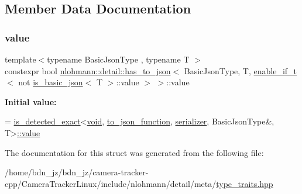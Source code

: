 \subsection{Member Data Documentation}
\mbox{\label{structnlohmann_1_1detail_1_1has__to__json_3_01_basic_json_type_00_01_t_00_01enable__if__t_3_01nob111e71d40e2273c290d1ce5c6a3b84f_ac5e2f95bd9fa54c6ea870e923e395b63}} 
\subsubsection{\texorpdfstring{value}{value}}
{\footnotesize\ttfamily template$<$typename Basic\+Json\+Type , typename T $>$ \\
constexpr bool \hyperlink{structnlohmann_1_1detail_1_1has__to__json}{nlohmann\+::detail\+::has\+\_\+to\+\_\+json}$<$ Basic\+Json\+Type, T, \hyperlink{namespacenlohmann_1_1detail_a02bcbc878bee413f25b985ada771aa9c}{enable\+\_\+if\+\_\+t}$<$ not \hyperlink{structnlohmann_1_1detail_1_1is__basic__json}{is\+\_\+basic\+\_\+json}$<$ T $>$\+::value $>$ $>$\+::value\hspace{0.3cm}{\ttfamily [static]}}

{\bfseries Initial value\+:}
\begin{DoxyCode}
=
        \hyperlink{namespacenlohmann_1_1detail_a7542b4dbac07817fd4849ecfa4619def}{is\_detected\_exact}<\hyperlink{namespacenlohmann_1_1detail_a59fca69799f6b9e366710cb9043aa77d}{void}, \hyperlink{namespacenlohmann_1_1detail_af846b6cf2f926009ff3a7a61495ca383}{to\_json\_function}, 
      \hyperlink{structnlohmann_1_1detail_1_1has__to__json_3_01_basic_json_type_00_01_t_00_01enable__if__t_3_01nob111e71d40e2273c290d1ce5c6a3b84f_a479098e9480e0adb30fb3fe3586a8005}{serializer}, BasicJsonType&,
        T>\hyperlink{structnlohmann_1_1detail_1_1has__to__json_3_01_basic_json_type_00_01_t_00_01enable__if__t_3_01nob111e71d40e2273c290d1ce5c6a3b84f_ac5e2f95bd9fa54c6ea870e923e395b63}{::value}
\end{DoxyCode}


The documentation for this struct was generated from the following file\+:\begin{DoxyCompactItemize}
\item 
/home/bdn\+\_\+jz/bdn\+\_\+jz/camera-\/tracker-\/cpp/\+Camera\+Tracker\+Linux/include/nlohmann/detail/meta/\hyperlink{type__traits_8hpp}{type\+\_\+traits.\+hpp}\end{DoxyCompactItemize}
